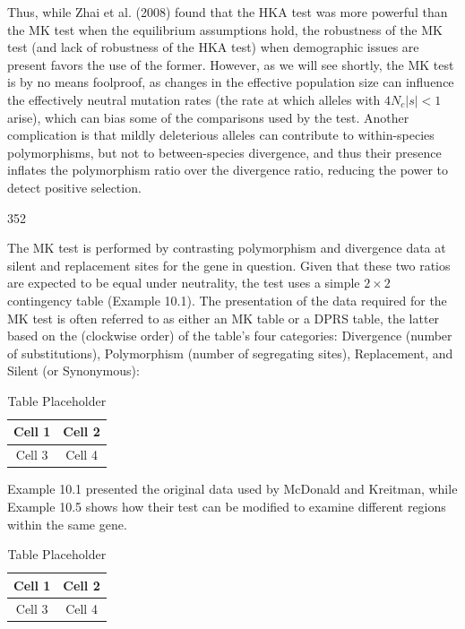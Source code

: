 \documentclass{article}
\begin{document}
Thus, while Zhai et al. (2008) found that the HKA test was more powerful than the MK test when the equilibrium assumptions hold, the robustness of the MK test (and lack of robustness of the HKA test) when demographic issues are present favors the use of the former. However, as we will see shortly, the MK test is by no means foolproof, as changes in the effective population size can influence the effectively neutral mutation rates (the rate at which alleles with  $ 4N_c|s| < 1 $ arise), which can bias some of the comparisons used by the test. Another complication is that mildly deleterious alleles can contribute to within-species polymorphisms, but not to between-species divergence, and thus their presence inflates the polymorphism ratio over the divergence ratio, reducing the power to detect positive selection.

352

The MK test is performed by contrasting polymorphism and divergence data at silent and replacement sites for the gene in question. Given that these two ratios are expected to be equal under neutrality, the test uses a simple  $ 2 \times 2 $ contingency table (Example 10.1). The presentation of the data required for the MK test is often referred to as either an MK table or a DPRS table, the latter based on the (clockwise order) of the table's four categories: Divergence (number of substitutions), Polymorphism (number of segregating sites), Replacement, and Silent (or Synonymous):

\begin{table}[h]
\centering
\begin{tabular}{|c|c|}
\hline
Cell 1 & Cell 2 \\
\hline
Cell 3 & Cell 4 \\
\hline
\end{tabular}
\caption{Table Placeholder}
\end{table}

Example 10.1 presented the original data used by McDonald and Kreitman, while Example 10.5 shows how their test can be modified to examine different regions within the same gene.

\begin{table}[h]
\centering
\begin{tabular}{|c|c|}
\hline
Cell 1 & Cell 2 \\
\hline
Cell 3 & Cell 4 \\
\hline
\end{tabular}
\caption{Table Placeholder}
\end{table}
\end{document}
